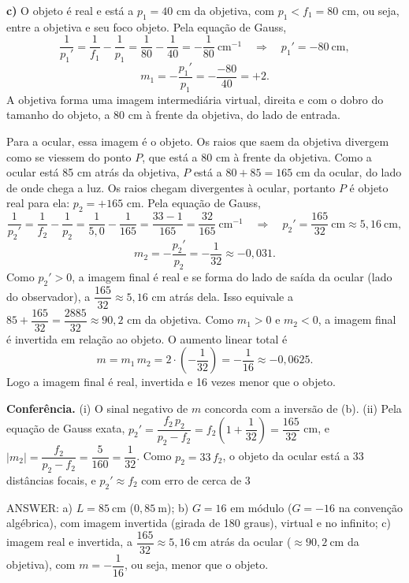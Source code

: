 \documentclass{article}%
\begin{document}
\textbf{c)} O objeto é real e está a $p_1=40$ cm da objetiva, com $p_1<f_1=80$ cm, ou seja, entre a objetiva e seu foco objeto. Pela equação de Gauss,
\[
\frac{1}{p_1'}=\frac{1}{f_1}-\frac{1}{p_1}=\frac{1}{80}-\frac{1}{40}=-\frac{1}{80}\ \text{cm}^{-1}\quad\Rightarrow\quad p_1'=-80\ \text{cm},
\]
\[
m_1=-\frac{p_1'}{p_1}=-\frac{-80}{40}=+2.
\]
A objetiva forma uma imagem intermediária virtual, direita e com o dobro do tamanho do objeto, a 80 cm à frente da objetiva, do lado de entrada.

Para a ocular, essa imagem é o objeto. Os raios que saem da objetiva divergem como se viessem do ponto $P$, que está a 80 cm à frente da objetiva. Como a ocular está 85 cm atrás da objetiva, $P$ está a $80+85=165$ cm da ocular, do lado de onde chega a luz. Os raios chegam divergentes à ocular, portanto $P$ é objeto real para ela: $p_2=+165$ cm. Pela equação de Gauss,
\[
\frac{1}{p_2'}=\frac{1}{f_2}-\frac{1}{p_2}=\frac{1}{5{,}0}-\frac{1}{165}=\frac{33-1}{165}=\frac{32}{165}\ \text{cm}^{-1}\quad\Rightarrow\quad p_2'=\frac{165}{32}\ \text{cm}\approx 5{,}16\ \text{cm},
\]
\[
m_2=-\frac{p_2'}{p_2}=-\frac{1}{32}\approx -0{,}031.
\]
Como $p_2'>0$, a imagem final é real e se forma do lado de saída da ocular (lado do observador), a $\dfrac{165}{32}\approx 5{,}16$ cm atrás dela. Isso equivale a $85+\dfrac{165}{32}=\dfrac{2885}{32}\approx 90{,}2$ cm da objetiva. Como $m_1>0$ e $m_2<0$, a imagem final é invertida em relação ao objeto. O aumento linear total é
\[
m=m_1\,m_2=2\cdot\left(-\frac{1}{32}\right)=-\frac{1}{16}\approx -0{,}0625.
\]
Logo a imagem final é real, invertida e 16 vezes menor que o objeto.

\textbf{Conferência.} (i) O sinal negativo de $m$ concorda com a inversão de (b). (ii) Pela equação de Gauss exata, $p_2'=\dfrac{f_2\,p_2}{p_2-f_2}=f_2\left(1+\dfrac{1}{32}\right)=\dfrac{165}{32}$ cm, e $|m_2|=\dfrac{f_2}{p_2-f_2}=\dfrac{5}{160}=\dfrac{1}{32}$. Como $p_2=33\,f_2$, o objeto da ocular está a 33 distâncias focais, e $p_2'\approx f_2$ com erro de cerca de 3%

ANSWER: a) $L=85\ \text{cm}$ ($0{,}85\ \text{m}$); b) $G=16$ em módulo ($G=-16$ na convenção algébrica), com imagem invertida (girada de 180 graus), virtual e no infinito; c) imagem real e invertida, a $\dfrac{165}{32}\approx 5{,}16\ \text{cm}$ atrás da ocular ($\approx 90{,}2\ \text{cm}$ da objetiva), com $m=-\dfrac{1}{16}$, ou seja, menor que o objeto.%
\newpage%
\end{document}
